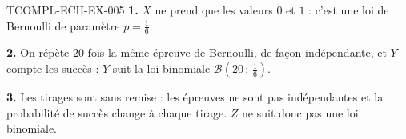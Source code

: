 \begin{corrige}{TCOMPL-ECH-EX-005}
\textbf{1.} $X$ ne prend que les valeurs $0$ et $1$ : c'est une loi de
Bernoulli de paramètre $p=\tfrac16$.

\textbf{2.} On répète $20$ fois la même épreuve de Bernoulli, de façon
indépendante, et $Y$ compte les succès : $Y$ suit la loi binomiale
$\mathcal{B}\left(20\,;\,\tfrac16\right)$.

\textbf{3.} Les tirages sont sans remise : les épreuves ne sont pas
indépendantes et la probabilité de succès change à chaque tirage. $Z$ ne suit
donc pas une loi binomiale.
\end{corrige}
